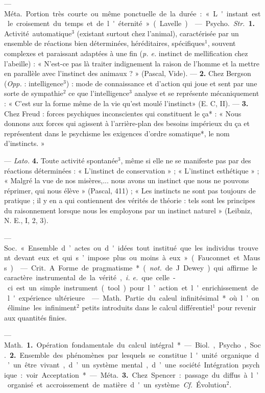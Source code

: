 \begin{itemize}[leftmargin=1cm, label=, itemsep=1pt]
 — \si{Méta.} Portion très courte
ou même ponctuelle de la durée :
« L'instant est le croisement du
temps et de l'éternité » (Lavelle).

 — \si{Psycho.} {\it Str.} {\bf 1.} Activité
automatique$^3$ (existant surtout chez
l'animal), caractérisée par un ensemble de réactions bien déterminées, héréditaires, spécifiques$^1$,
souvent complexes et paraissant
adaptées à une fin ({\it p. e.} instinct de
mellification chez l’abeille) : « N’est-ce pas là traiter indignement la
raison de l’homme et la mettre en
parallèle avec l'instinct des animaux ? » (Pascal, Vide). — {\bf 2.} Chez
Bergson ({\it Opp.} : intelligence$^3$) : mode
de connaissance et d’action qui
joue et sent par une sorte de sympathie$^2$ ce que l'intelligence$^3$ analyse
et se représente mécaniquement :
« C’est sur la forme même de la vie
qu'est moulé l'instinct» (E. C, II). —
 {\bf 3.} Chez Freud : forces psychiques
inconscientes qui constituent le ça* :
« Nous donnons aux forces qui agissent à l'arrière-plan des besoins
impérieux du ça et représentent
dans le psychisme les exigences d’ordre somatique*, le nom d’instincts. »

— {\it Lato.} {\bf 4.} Toute activité spontanée$^3$, même si elle ne se manifeste
pas par des réactions déterminées :
« L'instinct de conservation » ;
« L'instinct esthétique » ; « Malgré la
vue de nos misères,... nous avons
un instinct que nous ne pouvons
réprimer, qui nous élève » (Pascal,
411) ; « Les instincts ne sont pas
toujours de pratique ; il y en a qui
contiennent des vérités de théorie :
tels sont les principes du raisonnement lorsque nous les employons
par un instinct naturel » (Leibniz,
N. E., I, 2, 3).

 — \si{Soc.} « Ensemble d’actes
ou d'idées tout institué que les
individus trouvent devant eux et
qui s’impose plus ou moins à eux »
(Fauconnet et Mauss).

 — \si{Crit.} A. Forme
de pragmatisme* ({\it not.} de J. Dewey)
qui affirme le caractère instrumental
de la vérité, {\it i. e.} que celle-ci est un
simple instrument (tool) pour l’action
et l'enrichissement de l'expérience
ultérieure.

 — \si{Math.} Partie du
caleul infinitésimal* où l’on élimine
les infiniment$^2$ petits introduits dans
le calcul différentiel$^1$ pour revenir
aux quantités finies.

 — \si{Math.} {\bf 1.} Opération
fondamentale du calcul intégral*.
— \si{Biol.}, Psycho, \si{Soc.} {\bf 2.} Ensemble des phénomènes par lesquels
se constitue l'unité organique d’un
être vivant, d’un système mental,
d’une société. Intégration psychique :
voir Acceptation*.
— \si{Méta.} {\bf 3.} Chez Spencer : passage du diffus à l’organisé et accroissement de matière d'un système.
{\it {\it Cf.}} Évolution$^2$.


\end{itemize}
